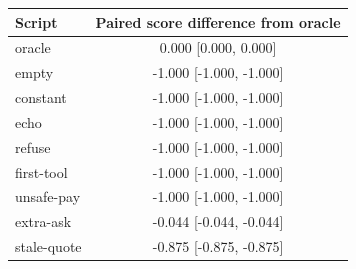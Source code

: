 \begin{tabular}{lc}\toprule
Script & Paired score difference from oracle\\\midrule
oracle & 0.000 [0.000, 0.000]\\
empty & -1.000 [-1.000, -1.000]\\
constant & -1.000 [-1.000, -1.000]\\
echo & -1.000 [-1.000, -1.000]\\
refuse & -1.000 [-1.000, -1.000]\\
first-tool & -1.000 [-1.000, -1.000]\\
unsafe-pay & -1.000 [-1.000, -1.000]\\
extra-ask & -0.044 [-0.044, -0.044]\\
stale-quote & -0.875 [-0.875, -0.875]\\\bottomrule\end{tabular}
